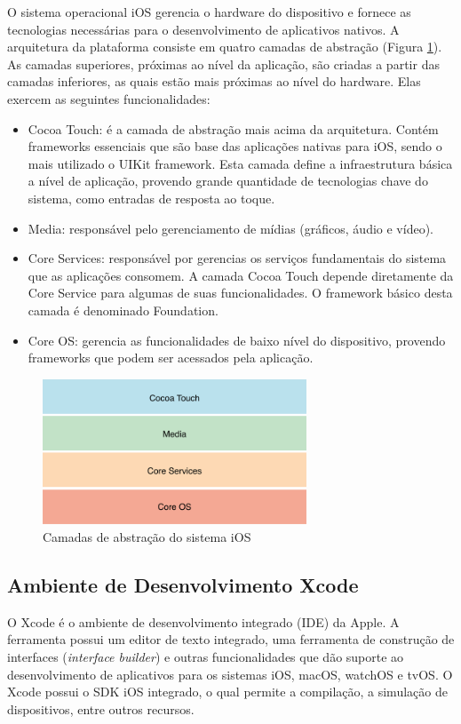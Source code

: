 O sistema operacional iOS gerencia o hardware do dispositivo e fornece as tecnologias necessárias para o desenvolvimento de aplicativos nativos. A arquitetura da plataforma consiste em quatro camadas de abstração (Figura \ref{fig:ios-architecture}). As camadas superiores, próximas ao nível da aplicação, são criadas a partir das camadas inferiores, as quais estão mais próximas ao nível do hardware. Elas exercem as seguintes funcionalidades:
\begin{itemize}
    \item Cocoa Touch: é a camada de abstração mais acima da arquitetura. Contém frameworks essenciais que são base das aplicações nativas para iOS, sendo o mais utilizado o UIKit framework. Esta camada define a infraestrutura básica a nível de aplicação, provendo grande quantidade de tecnologias chave do sistema, como entradas de resposta ao toque.
    \item Media: responsável pelo gerenciamento de mídias (gráficos, áudio e vídeo).
    \item Core Services: responsável por gerencias os serviços fundamentais do sistema que as aplicações consomem. A camada Cocoa Touch depende diretamente da Core Service para algumas de suas funcionalidades. O framework básico desta camada é denominado Foundation.
    \item Core OS: gerencia as funcionalidades de baixo nível do dispositivo, provendo frameworks que podem ser acessados pela aplicação.
\end{itemize}

\begin{figure}[h]
    \centering
    \includegraphics[width=0.7\textwidth]{pfc/figuras/ios-architecture.png}
    \caption{Camadas de abstração do sistema iOS}
    \label{fig:ios-architecture}
\end{figure}

\subsection{Ambiente de Desenvolvimento Xcode}
O Xcode é o ambiente de desenvolvimento integrado (IDE) da Apple. A ferramenta possui um editor de texto integrado, uma ferramenta de construção de interfaces (\textit{interface builder}) e outras funcionalidades que dão suporte ao desenvolvimento de aplicativos para os sistemas iOS, macOS, watchOS e tvOS. O Xcode possui o SDK iOS integrado, o qual permite a compilação, a simulação de dispositivos, entre outros recursos.

